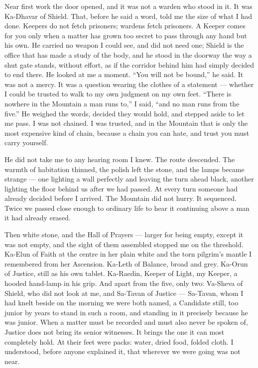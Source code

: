 Near first work the door opened, and it was not a warden who stood in it. It was Ka-Dhavar of Shield. That, before he said a word, told me the size of what I had done. Keepers do not fetch prisoners; wardens fetch prisoners. A Keeper comes for you only when a matter has grown too secret to pass through any hand but his own. He carried no weapon I could see, and did not need one; Shield is the office that has made a study of the body, and he stood in the doorway the way a shut gate stands, without effort, as if the corridor behind him had simply decided to end there. He looked at me a moment. ``You will not be bound,'' he said. It was not a mercy. It was a question wearing the clothes of a statement — whether I could be trusted to walk to my own judgment on my own feet. ``There is nowhere in the Mountain a man runs to,'' I said, ``and no man runs from the five.'' He weighed the words, decided they would hold, and stepped aside to let me pass. I was not chained. I was trusted, and in the Mountain that is only the most expensive kind of chain, because a chain you can hate, and trust you must carry yourself.\par
 
He did not take me to any hearing room I knew. The route descended. The warmth of habitation thinned, the polish left the stone, and the lamps became strange — one lighting a wall perfectly and leaving the turn ahead black, another lighting the floor behind us after we had passed. At every turn someone had already decided before I arrived. The Mountain did not hurry. It sequenced. Twice we passed close enough to ordinary life to hear it continuing above a man it had already erased.\par
 
Then white stone, and the Hall of Prayers — larger for being empty, except it was not empty, and the sight of them assembled stopped me on the threshold. Ka-Elun of Faith at the centre in her plain white and the torn pilgrim's mantle I remembered from her Ascension. Ka-Leth of Balance, broad and grey. Ka-Orun of Justice, still as his own tablet. Ka-Raedin, Keeper of Light, my Keeper, a hooded hand-lamp in his grip. And apart from the five, only two: Va-Sheva of Shield, who did not look at me, and Sa-Tavan of Justice — Sa-Tavan, whom I had knelt beside on the morning we were both named, a Candidate still, too junior by years to stand in such a room, and standing in it precisely because he was junior. When a matter must be recorded and must also never be spoken of, Justice does not bring its senior witnesses. It brings the one it can most completely hold. At their feet were packs: water, dried food, folded cloth. I understood, before anyone explained it, that wherever we were going was not near.\par
 
